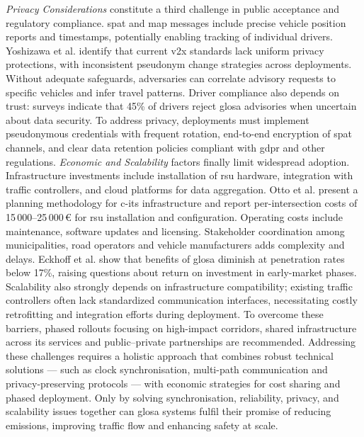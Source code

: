 \textit{Privacy Considerations} constitute a third challenge in public acceptance and regulatory compliance. \ac{spat} and \ac{map} messages include precise vehicle position reports and timestamps, potentially enabling tracking of individual drivers. Yoshizawa et al. \cite{Yoshizawa2022} identify that current \ac{v2x} standards lack uniform privacy protections, with inconsistent pseudonym change strategies across deployments. Without adequate safeguards, adversaries can correlate advisory requests to specific vehicles and infer travel patterns. Driver compliance also depends on trust: surveys indicate that 45\% of drivers reject \ac{glosa} advisories when uncertain about data security. \cite{Application2011} To address privacy, deployments must implement pseudonymous credentials with frequent rotation, end-to-end encryption of \ac{spat} channels, and clear data retention policies compliant with \ac{gdpr} and other regulations.
\mynewline
\textit{Economic and Scalability} factors finally limit widespread adoption. Infrastructure investments include installation of \ac{rsu} hardware, integration with traffic controllers, and cloud platforms for data aggregation. Otto et al. \cite{Otto2023} present a planning methodology for \ac{c-its} infrastructure and report per-intersection costs of 15\,000--25\,000\,\euro{} for \ac{rsu} installation and configuration. Operating costs include maintenance, software updates and licensing. Stakeholder coordination among municipalities, road operators and vehicle manufacturers adds complexity and delays. Eckhoff et al. \cite{Eckhoff2013} show that benefits of \ac{glosa} diminish at penetration rates below 17\%, raising questions about return on investment in early-market phases. Scalability also strongly depends on infrastructure compatibility; existing traffic controllers often lack standardized communication interfaces, necessitating costly retrofitting and integration efforts during deployment. To overcome these barriers, phased rollouts focusing on high-impact corridors, shared infrastructure across \ac{its} services and public–private partnerships are recommended.
\mynewline
Addressing these challenges requires a holistic approach that combines robust technical solutions --- such as clock synchronisation, multi-path communication and privacy-preserving protocols --- with economic strategies for cost sharing and phased deployment. Only by solving synchronisation, reliability, privacy, and scalability issues together can \ac{glosa} systems fulfil their promise of reducing emissions, improving traffic flow and enhancing safety at scale.


